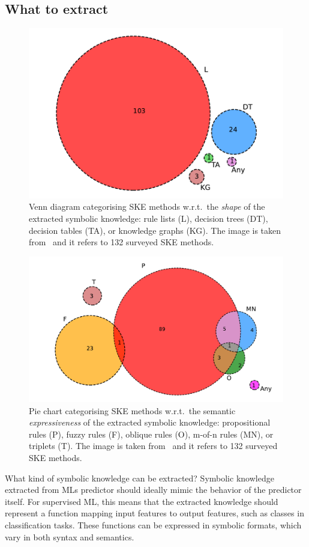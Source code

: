\subsection{What to extract}\label{subsec:what-to-extract}
%
\begin{figure}
    \centering
    \includegraphics[width=.4\linewidth]{figures/ske-rule-shape}
    \caption[Venn diagram categorising SKE methods]{
        Venn diagram categorising \gls{SKE} methods w.r.t.\ the \emph{shape} of the extracted symbolic knowledge: rule lists (L), decision trees (DT), decision tables (TA), or knowledge graphs (KG).
        The image is taken from~\cite{DBLP:journals/csur/CiattoSAMO24} and it refers to 132 surveyed \gls{SKE} methods.
    }
    \label{fig:pie-ski-shape}
\end{figure}
%
\begin{figure}
    \centering
    \includegraphics[width=.4\linewidth]{figures/ske-rule-format}
    \caption[Pie chart categorising SKE methods]{
        Pie chart categorising \gls{SKE} methods w.r.t.\ the semantic \emph{expressiveness} of the extracted symbolic knowledge: propositional rules (P), fuzzy rules (F), oblique rules (O), m-of-n rules (MN), or triplets (T).
        The image is taken from~\cite{DBLP:journals/csur/CiattoSAMO24} and it refers to 132 surveyed \gls{SKE} methods.
    }
    \label{fig:pie-ski-expressiveness}
\end{figure}

What kind of symbolic knowledge can be extracted?
%
Symbolic knowledge extracted from \glspl{ML} predictor should ideally mimic the behavior of the predictor itself.
%
For supervised \gls{ML}, this means that the extracted knowledge should represent a function mapping input features to output features, such as classes in classification tasks.
%
These functions can be expressed in symbolic formats, which vary in both syntax and semantics.

